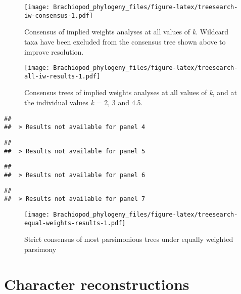 \documentclass[openany]{book}
\theoremstyle{definition}
\theoremstyle{definition}
\theoremstyle{definition}
\theoremstyle{remark}
\begin{document}
\begin{figure}
\centering
\texttt{[image: Brachiopod\_phylogeny\_files/figure-latex/treesearch-iw-consensus-1.pdf]}
\caption{\label{fig:treesearch-iw-consensus}Consensus of implied weights analyses at all values of
\emph{k}. Wildcard taxa have been excluded from the consensus tree shown
above to improve resolution.}
\end{figure}








\clearpage 

\begin{figure}
\centering
\texttt{[image: Brachiopod\_phylogeny\_files/figure-latex/treesearch-all-iw-results-1.pdf]}
\caption{\label{fig:treesearch-all-iw-results}Consensus trees of implied weights analyses
at all values of \emph{k}, and at the individual
values \emph{k} = 2, 3 and 4.5.}
\end{figure}

\clearpage 

\begin{verbatim}
## 
##  > Results not available for panel 4
\end{verbatim}

\begin{verbatim}
## 
##  > Results not available for panel 5
\end{verbatim}

\begin{verbatim}
## 
##  > Results not available for panel 6
\end{verbatim}

\begin{verbatim}
## 
##  > Results not available for panel 7
\end{verbatim}

\clearpage

\begin{figure}
\centering
\texttt{[image: Brachiopod\_phylogeny\_files/figure-latex/treesearch-equal-weights-results-1.pdf]}
\caption{\label{fig:treesearch-equal-weights-results}Strict consensus of
most parsimonious trees under equally weighted parsimony}
\end{figure}

\clearpage

\hypertarget{reconstructions}{\chapter{Character
reconstructions}\label{reconstructions}}
\end{document}
